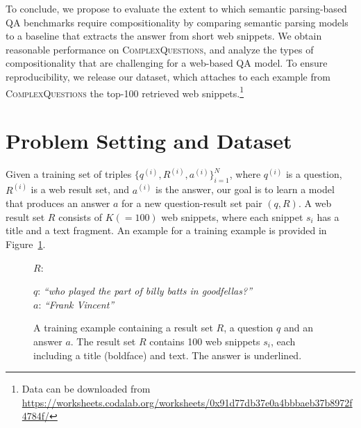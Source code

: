 \documentclass[11pt,a4paper]{article}
\newcommand\nl[1]{{\it``#1''}}
\begin{document}
To conclude, we propose to evaluate the extent to which semantic parsing-based QA benchmarks require compositionality by comparing semantic parsing models to a baseline that extracts the answer from short web snippets. We  obtain reasonable performance on \textsc{ComplexQuestions}, and analyze the types of compositionality that are challenging for a web-based QA model. To ensure reproducibility, we release our dataset, which attaches to each example  from \textsc{ComplexQuestions} the top-100 retrieved web snippets.\footnote{Data can be downloaded from \url{https://worksheets.codalab.org/worksheets/0x91d77db37e0a4bbbaeb37b8972f4784f/}}
 \section{Problem Setting and Dataset}
\label{sec:data}
Given a training set of triples $\{q^{(i)}, R^{(i)}, a^{(i)}\}_{i=1}^{N}$, where $q^{(i)}$ is a question, $R^{(i)}$ is a web result set, and $a^{(i)}$ is the answer, our goal is to learn a model that produces an answer $a$ for a new question-result set pair $(q, R)$. A web result set $R$ consists of $K(=100)$ web snippets, where each snippet $s_i$ has a title and a text fragment. An example for a training example is provided in Figure~\ref{fig:training_ex}.

\begin{figure}
\centering
\noindent
\small 

$R$:
\begin{minipage}{23em}
\noindent \textbf{$q$}: \nl{who played the part of billy batts in goodfellas?}\\
\noindent \textbf{$a$}: \nl{Frank Vincent}
\end{minipage}
\caption{\small A training example containing a result set $R$, a question $q$ and an answer $a$.
The result set $R$ contains 100 web snippets $s_i$, each including a title (boldface) and text. The answer is underlined.
}
\label{fig:training_ex}
\end{figure}
 
\end{document}
